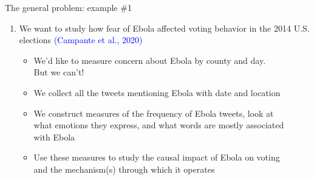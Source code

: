 \documentclass[english]{beamer}
\begin{document}
\begin{frame}{The general problem: example \#1}

\begin{enumerate}

\item We want to study how fear of Ebola affected voting behavior in the 2014 U.S. elections \textcolor{blue}{(Campante et al., 2020)}

\vspace{4pt}

\begin{itemize}

\setlength{\itemindent}{-0.9em}
\setlength{\itemsep}{1.5em}

\item We'd like to measure concern about Ebola by county and day. \\
\hspace{-9pt}But we can't!

\item We collect all the tweets mentioning Ebola with date and location

\item We construct measures of the frequency of Ebola tweets, look at\\
\hspace{-9pt}what emotions they express, and what words are mostly associated\\
\hspace{-9pt}with Ebola

\item Use these measures to study the causal impact of Ebola on voting\\
\hspace{-9pt}and the mechanism(s) through which it operates

\end{itemize}

\end{enumerate}

\end{frame}
\end{document}
